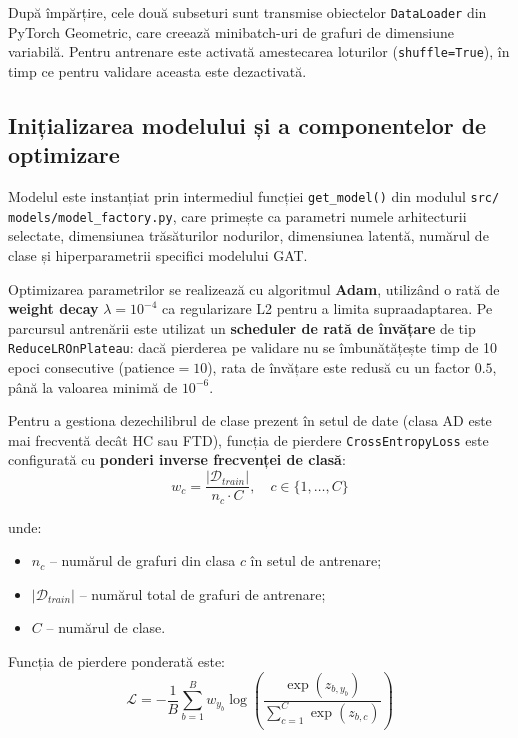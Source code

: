 \documentclass[12pt,a4paper]{report}
\theoremstyle{definition}
\theoremstyle{remark}
\begin{document}
După împărțire, cele două subseturi sunt transmise obiectelor \texttt{DataLoader} din PyTorch Geometric, care creează minibatch-uri de grafuri de dimensiune variabilă. Pentru antrenare este activată amestecarea loturilor (\texttt{shuffle=True}), în timp ce pentru validare aceasta este dezactivată.

\subsection{Inițializarea modelului și a componentelor de optimizare}

Modelul este instanțiat prin intermediul funcției \texttt{get\_model()} din modulul \texttt{src/ models/model\_factory.py}, care primește ca parametri numele arhitecturii selectate, dimensiunea trăsăturilor nodurilor, dimensiunea latentă, numărul de clase și hiperparametrii specifici modelului GAT.

Optimizarea parametrilor se realizează cu algoritmul \textbf{Adam}, utilizând o rată de
\textbf{weight decay} $\lambda = 10^{-4}$ ca regularizare L2 pentru a limita
supraadaptarea. Pe parcursul antrenării este utilizat un \textbf{scheduler de rată de
învățare} de tip \texttt{ReduceLROnPlateau}: dacă pierderea pe validare nu se
îmbunătățește timp de 10 epoci consecutive (patience$=10$), rata de învățare este
redusă cu un factor $0.5$, până la valoarea minimă de $10^{-6}$.

Pentru a gestiona dezechilibrul de clase prezent în setul de date (clasa AD este mai
frecventă decât HC sau FTD), funcția de pierdere \texttt{CrossEntropyLoss} este
configurată cu \textbf{ponderi inverse frecvenței de clasă}:
\begin{equation}
    w_c = \frac{|\mathcal{D}_{train}|}{n_c \cdot C}, \quad c \in \{1, \ldots, C\}
    \label{eq:class_weights}
\end{equation}

\noindent unde:
\begin{itemize}
    \item $n_c$ -- numărul de grafuri din clasa $c$ în setul de antrenare;
    \item $|\mathcal{D}_{train}|$ -- numărul total de grafuri de antrenare;
    \item $C$ -- numărul de clase.
\end{itemize}

Funcția de pierdere ponderată este:
\begin{equation}
    \mathcal{L} = - \frac{1}{B} \sum_{b=1}^{B} w_{y_b} \log \left(
    \frac{\exp(z_{b, y_b})}{\sum_{c=1}^{C} \exp(z_{b,c})}
    \right)
    \label{eq:cross_entropy}
\end{equation}
\end{document}
